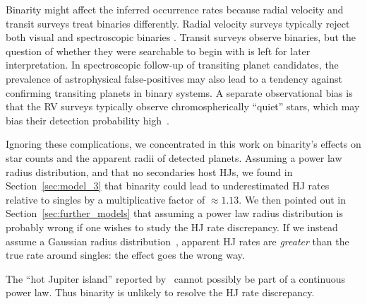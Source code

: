\documentclass[12pt,modern]{aastex61}
\begin{document}
Binarity might affect the inferred occurrence rates because 
radial velocity and transit surveys treat binaries differently.
Radial velocity surveys typically reject both visual and spectroscopic
binaries \citep[\textit{e.g.},][]{wright_frequency_2012}.  Transit
surveys observe binaries, but the question of whether they were
searchable to begin with is left for later interpretation.  In
spectroscopic follow-up of transiting planet candidates, the
prevalence of astrophysical false-positives may also lead to a
tendency against confirming transiting planets in binary systems.  A
separate observational bias is that the RV surveys typically observe
chromospherically ``quiet'' stars, which may bias their detection
probability high~\citep{bastien_radial_2014}.

Ignoring these complications, we concentrated in this work on
binarity's effects on star counts and the apparent radii of detected
planets.  Assuming a power law radius distribution, and that no
secondaries host HJs, we found in Section~\ref{sec:model_3} that
binarity could lead to underestimated HJ rates relative to singles by
a multiplicative factor of $\approx 1.13$.  We then pointed out in
Section~\ref{sec:further_models} that assuming a power law radius
distribution is probably wrong if one wishes to study the HJ rate
discrepancy.  If we instead assume a Gaussian radius
distribution~\citep[following][]{petigura_CKS_2017}, apparent HJ rates
are {\it greater} than the true rate around singles: the effect goes
the wrong way.

The ``hot Jupiter island'' reported by~\citet{petigura_CKS_2017}
cannot possibly be part of a continuous power law.  Thus binarity is
unlikely to resolve the HJ rate discrepancy.
\end{document}
